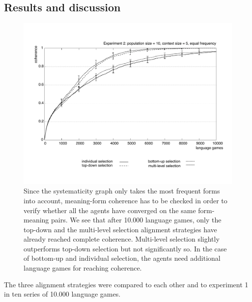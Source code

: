 \subsection{Results and discussion}

\begin{figure}[p]
\centerline{\includegraphics[width=\textwidth]{Chapter4/figs/coherence-vs-2}}
  \caption[Experiment 2: meaning-form coherence]{Since the systematicity graph only takes the most frequent forms into account, meaning-form coherence has to be checked in order to verify whether all the agents have converged on the same form-meaning pairs. We see that after 10.000 language games, only the top-down and the multi-level selection alignment strategies have already reached complete coherence. Multi-level selection slightly outperforms top-down selection but not significantly so. In the case of bottom-up and individual selection, the agents need additional language games for reaching coherence.}
   \label{f:coherence2}
\end{figure}

The three alignment strategies were compared to each other and to experiment 1 in ten series of 10.000 language games.


